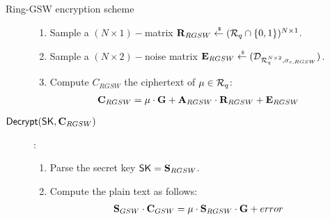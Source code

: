 \begin{subsection}{Ring-GSW encryption scheme~\cite{DBLP:journals/tc/KhedrGV16}}
\begin{description}
\begin{enumerate}
    \item Sample a $(N \times 1)-$matrix $\mathbf{R}_{RGSW} \stackrel{{\scriptscriptstyle \mkern4mu \$}}{\gets} ({\mathcal{R}}_q \cap\{0,1\})^{N \times 1}$.
    \item Sample a $(N \times 2)-$noise matrix $\mathbf{E}_{RGSW} \stackrel{{\scriptscriptstyle \mkern4mu \$}}{\gets} (\mathcal{D}_{{\mathcal{R}}_q^{N \times 2}, \sigma_{c, RGSW}})$.
    \item Compute $C_{RGSW}$ the ciphertext of $\mu \in {\mathcal{R}}_q$:
      \begin{align*}
        \mathbf{C}_{RGSW} &= \mu \cdot \mathbf{G} + \mathbf{A}_{RGSW} \cdot \mathbf{R}_{RGSW} + \mathbf{E}_{RGSW}
      \end{align*}
    \end{enumerate}
  \item[${\mathsf{Decrypt}}(\mathsf{SK}, \mathbf{C}_{RGSW})$]:
    \begin{enumerate}
    \item Parse the secret key $\mathsf{SK} = \mathbf{S}_{RGSW}$.
    \item Compute the plain text as follows:
      \begin{align*}
        \mathbf{S}_{GSW} \cdot \mathbf{C}_{GSW} &= \mu \cdot \mathbf{S}_{RGSW} \cdot \mathbf{G} + error 
      \end{align*}
    
    \end{enumerate}
  \end{description}
  
\end{subsection}


